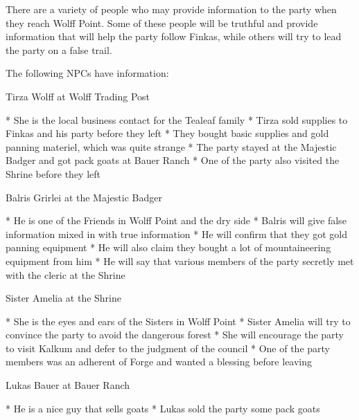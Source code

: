 There are a variety of people who may provide information to the party when they reach Wolff Point.
Some of these people will be truthful and provide information that will help the party follow Finkas, while others will try to lead the party on a false trail.

The following NPCs have information:

Tirza Wolff at Wolff Trading Post

* She is the local business contact for the Tealeaf family
* Tirza sold supplies to Finkas and his party before they left
* They bought basic supplies and gold panning materiel, which was quite strange
* The party stayed at the Majestic Badger and got pack goats at Bauer Ranch
* One of the party also visited the Shrine before they left

Balris Grirlei at the Majestic Badger

* He is one of the Friends in Wolff Point and the dry side
* Balris will give false information mixed in with true information
* He will confirm that they got gold panning equipment
* He will also claim they bought a lot of mountaineering equipment from him
* He will say that various members of the party secretly met with the cleric at the Shrine

Sister Amelia at the Shrine

* She is the eyes and ears of the Sisters in Wolff Point
* Sister Amelia will try to convince the party to avoid the dangerous forest
* She will encourage the party to visit Kalkum and defer to the judgment of the council
* One of the party members was an adherent of Forge and wanted a blessing before leaving

Lukas Bauer at Bauer Ranch

* He is a nice guy that sells goats
* Lukas sold the party some pack goats
